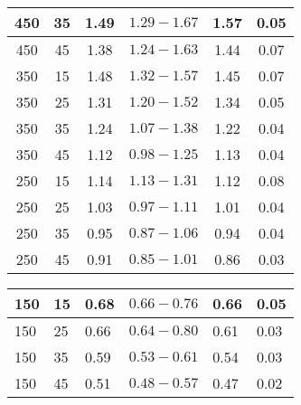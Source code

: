 \documentclass[10pt]{article}
\begin{document}
\begin{center}
\begin{tabular}{|c|c|c|c|c|c|}
\hline
450 & 35 & 1.49 & $1.29-1.67$ & 1.57 & 0.05 \\
\hline
450 & 45 & 1.38 & $1.24-1.63$ & 1.44 & 0.07 \\
\hline
350 & 15 & 1.48 & $1.32-1.57$ & 1.45 & 0.07 \\
\hline
350 & 25 & 1.31 & $1.20-1.52$ & 1.34 & 0.05 \\
\hline
350 & 35 & 1.24 & $1.07-1.38$ & 1.22 & 0.04 \\
\hline
350 & 45 & 1.12 & $0.98-1.25$ & 1.13 & 0.04 \\
\hline
250 & 15 & 1.14 & $1.13-1.31$ & 1.12 & 0.08 \\
\hline
250 & 25 & 1.03 & $0.97-1.11$ & 1.01 & 0.04 \\
\hline
250 & 35 & 0.95 & $0.87-1.06$ & 0.94 & 0.04 \\
\hline
250 & 45 & 0.91 & $0.85-1.01$ & 0.86 & 0.03 \\
\hline
\end{tabular}
\end{center}

\begin{center}
\begin{tabular}{|l|l|l|l|l|l|}
\hline
150 & 15 & 0.68 & $0.66-0.76$ & 0.66 & 0.05 \\
\hline
150 & 25 & 0.66 & $0.64-0.80$ & 0.61 & 0.03 \\
\hline
150 & 35 & 0.59 & $0.53-0.61$ & 0.54 & 0.03 \\
\hline
150 & 45 & 0.51 & $0.48-0.57$ & 0.47 & 0.02 \\
\hline
\end{tabular}
\end{center}
\end{document}
